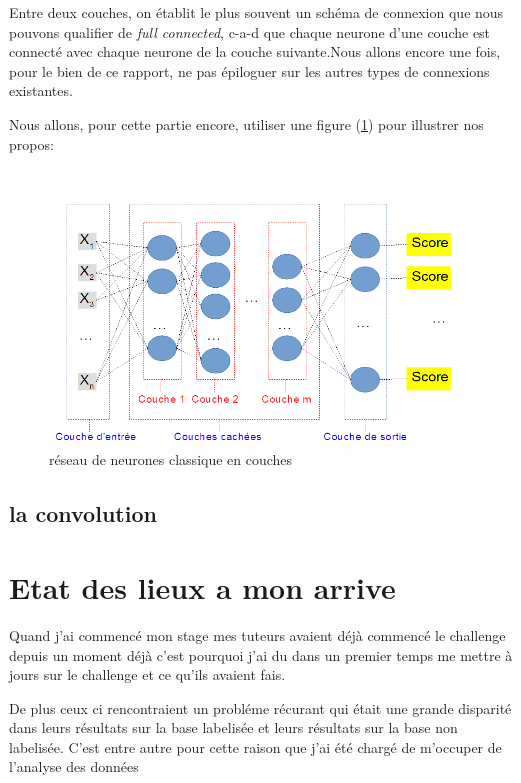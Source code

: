 {Entre deux couches, on établit le plus souvent un schéma de connexion que nous pouvons qualifier de \textit{full connected}, c-a-d que chaque neurone d'une couche est connecté avec chaque neurone de la couche suivante.Nous allons encore une fois, pour le bien de ce rapport, ne pas épiloguer sur les autres types de connexions existantes.\newline

Nous allons, pour cette partie encore, utiliser une figure (\ref{reseauClassique}) pour illustrer nos propos:

\begin{figure}[h]
\includegraphics[width=16.5cm]{./images/multicouche.png}
\caption{réseau de neurones classique en couches}
\label{reseauClassique}
\end{figure}


\subsection{la convolution}
\label{la convolution}

\hypertarget{Etat des lieux a mon arrive}{%
\section{Etat des lieux a mon arrive}
\label{Etat des lieux à mon arrivé}

Quand j'ai commencé mon stage mes tuteurs avaient déjà commencé le challenge depuis un moment déjà c'est pourquoi j'ai du dans un premier temps me mettre à jours sur le challenge et ce qu'ils avaient fais.






De plus ceux ci rencontraient un probléme récurant qui était une grande disparité dans leurs résultats sur la base labelisée et leurs résultats sur la base non labelisée.
C'est entre autre pour cette raison que j'ai été chargé de m'occuper de l'analyse des données


}}
